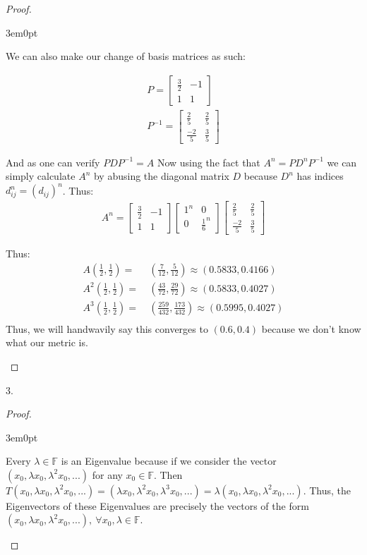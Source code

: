 \documentclass[11pt]{article}
\newcommand{\F}{\mathbb{F}}
\newenvironment{myproof}
{\begin{proof} \begin{adjustwidth}{3em}{0pt}$ $\par\nobreak\ignorespaces}
{\end{adjustwidth} \end{proof}}
\begin{document}
\begin{flushleft}
\begin{myproof}
We can also make our change of basis matrices as such:

\begin{align*}
P=
\begin{bmatrix}
\frac{3}{2} & -1 \\
1 & 1
\end{bmatrix} \\
P^{-1}=
\begin{bmatrix}
\frac{2}{5} & \frac{2}{5} \\
\frac{-2}{5} & \frac{3}{5}
\end{bmatrix}
\end{align*}

And as one can verify $PDP^{-1} = A$ Now using the fact that $A^n = PD^nP^{-1}$ we can simply calculate $A^n$ by abusing the diagonal matrix $D$ because $D^n$ has indices $d^n_{ij} = (d_{ij})^n$. Thus:
\begin{align*}
A^n = \begin{bmatrix}
\frac{3}{2} & -1 \\
1 & 1
\end{bmatrix}
\begin{bmatrix}
1^n & 0 \\
0 & \frac{1}{6}^n
\end{bmatrix}
\begin{bmatrix}
\frac{2}{5} & \frac{2}{5} \\
\frac{-2}{5} & \frac{3}{5}
\end{bmatrix}
\end{align*}

Thus:
\begin{align*}
A(\frac{1}{2}, \frac{1}{2}) = & \ (\frac{7}{12}, \frac{5}{12}) \approx (0.5833,0.4166) \\
A^2(\frac{1}{2}, \frac{1}{2}) = & \ (\frac{43}{72}, \frac{29}{72}) \approx (0.5833,0.4027)\\
A^3(\frac{1}{2}, \frac{1}{2}) = & \ (\frac{259}{432}, \frac{173}{432}) \approx (0.5995,0.4027)\\
\end{align*}
Thus, we will handwavily say this converges to $(0.6, 0.4)$ because we don't know what our metric is.
\end{myproof}

\newpage

3.

\begin{myproof}

Every $\lambda \in \F$ is an Eigenvalue because if we consider the vector $(x_0, \lambda x_0, \lambda^2 x_0,...)$ for any $x_0 \in \F$. Then $T(x_0, \lambda x_0, \lambda^2 x_0,...) =  (\lambda x_0, \lambda^2 x_0, \lambda^3 x_0,...) = \lambda(x_0, \lambda x_0, \lambda^2 x_0,...)$. Thus, the Eigenvectors of these Eigenvalues are precisely the vectors of the form $(x_0, \lambda x_0, \lambda^2 x_0,...), \ \forall x_0, \lambda \in \F$.


\end{myproof}
\end{flushleft}
\end{document}
